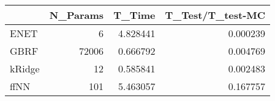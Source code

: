\begin{tabular}{lrrr}
\toprule
{} &  N\_Params &    T\_Time &  T\_Test/T\_test-MC \\
\midrule
ENET   &         6 &  4.828441 &          0.000239 \\
GBRF   &     72006 &  0.666792 &          0.004769 \\
kRidge &        12 &  0.585841 &          0.002483 \\
ffNN   &       101 &  5.463057 &          0.167757 \\
\bottomrule
\end{tabular}
